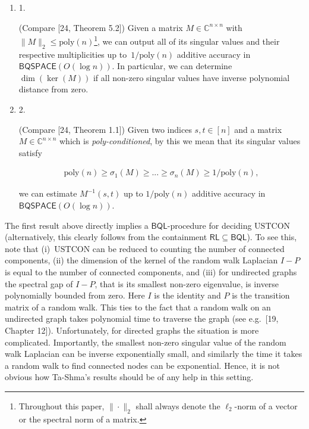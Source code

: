 \begin{enumerate}


\item[] 
1. 


(Compare [24, Theorem 5.2])
Given a matrix $M\in\mathbb{C}^{n\times n}$ with $\|M\|_{2}\leq\mathrm{poly}(n)$\footnote{Throughout this paper, $\|\cdot\|_{2}$ shall always denote the $\ell_{2}$-norm of a vector or the spectral norm of a matrix.}, we can output all of its singular values and their respective multiplicities up to $1/\mathrm{poly}(n)$ additive accuracy in $\mathsf{BQSPACE}(O(\log n))$. In particular, we can determine $\dim(\ker(M))$ if all non-zero singular values have inverse polynomial distance from zero.\par





\item[] 
2. 


(Compare [24, Theorem 1.1])
Given two indices $s,t\in[n]$ and a matrix $M\in\mathbb{C}^{n\times n}$ which is \emph{poly-conditioned}, by this we mean that its singular values satisfy\par


\[\begin{gathered}
\displaystyle\mathrm{poly}(n)\geq\sigma_{1}(M)\geq...\geq\sigma_{n}(M)\geq 1/\mathrm{poly}(n),
\end{gathered}\]


we can estimate $M^{-1}(s,t)$ up to $1/\mathrm{poly}(n)$ additive accuracy in $\mathsf{BQSPACE}(O(\log n))$.\par





\end{enumerate}




The first result above directly implies a $\mathsf{BQL}$-procedure for deciding $\mathrm{USTCON}$ (alternatively, this clearly follows from the containment $\mathsf{RL}\subseteq\mathsf{BQL}$).
To see this, note that (i) $\mathrm{USTCON}$ can be reduced to counting the number of connected components, (ii) the dimension of the kernel of the random walk Laplacian $I-P$ is equal to the number of connected components, and (iii) for undirected graphs the spectral gap of $I-P$, that is its smallest non-zero eigenvalue, is inverse polynomially bounded from zero.
Here $I$ is the identity and $P$ is the transition matrix of a random walk.
This ties to the fact that a random walk on an undirected graph takes polynomial time to traverse the graph (see e.g. [19, Chapter 12]).
Unfortunately, for directed graphs the situation is more complicated. Importantly, the smallest non-zero singular value of the random walk Laplacian can be inverse exponentially small, and similarly the time it takes a random walk to find connected nodes can be exponential.
Hence, it is not obvious how Ta-Shma’s results should be of any help in this setting.\par




